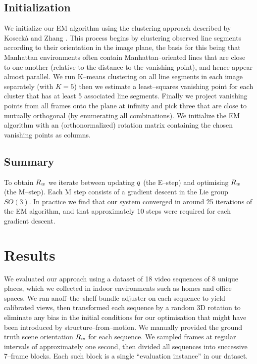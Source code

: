 \subsection{Initialization}

We initialize our EM algorithm using the clustering approach described
by Koseck\`{a} and Zhang \cite{Zhang02}. This process begins by
clustering observed line segments according to their orientation in
the image plane, the basis for this being that Manhattan environments
often contain Manhattan--oriented lines that are close to one another
(relative to the distance to the vanishing point), and hence appear
almost parallel. We run K--means clustering on all line segments in
each image separately (with $K=5$) then we estimate a least--squares
vanishing point for each cluster that has at least 5 associated line
segments. Finally we project vanishing points from all frames onto the
plane at infinity and pick three that are close to mutually orthogonal
(by enumerating all combinations). We initialize the EM algorithm with
an (orthonormalized) rotation matrix containing the chosen vanishing
points as columns.\changedsinceviva

\subsection{Summary}
To obtain $\SceneR$ we iterate between updating $\PosteriorEst$ (the
E--step) and optimising $\SceneR$ (the M--step). Each M step consists
of a gradient descent in the Lie group $SO(3)$. In practice we find
that our system converged in around 25 iterations of the EM algorithm,
and that approximately 10 steps were required for each gradient
descent.

\section{Results}

We evaluated our approach using a dataset of 18 video sequences of 8
unique places, which we collected in indoor environments such as homes
and office spaces. We ran an\changedsinceviva off--the--shelf bundle
adjuster on each sequence to yield calibrated views, then transformed
each sequence by a random 3D rotation to eliminate any bias in the
initial conditions for our optimisation that might have been
introduced by structure--from--motion. We manually provided the ground
truth scene orientation $\SceneR$ for each sequence. We sampled frames
at regular intervals of approximately one second, then divided all
sequences into successive 7--frame blocks. Each such block is a single
``evaluation instance'' in our dataset.

